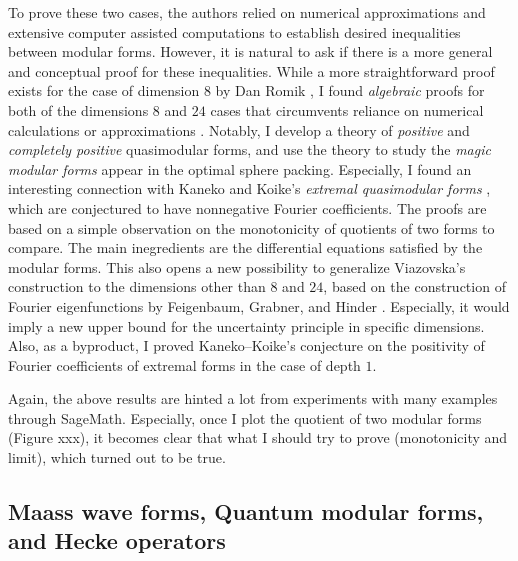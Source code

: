 \documentclass[12pt]{article}
\begin{document}
To prove these two cases, the authors \cite{viazovska2017sphere,cohn2017sphere} relied on numerical approximations and extensive computer assisted computations to establish desired inequalities between modular forms. However, it is natural to ask if there is a more general and conceptual proof for these inequalities.
While a more straightforward proof exists for the case of dimension $8$ by Dan Romik \cite{romik2023viazovska}, I found \emph{algebraic} proofs for both of the dimensions $8$ and $24$ cases that circumvents reliance on numerical calculations or approximations \cite{lee2024algebraic}.
Notably, I develop a theory of \emph{positive} and \emph{completely positive} quasimodular forms, and use the theory to study the \emph{magic modular forms} appear in the optimal sphere packing.
Especially, I found an interesting connection with Kaneko and Koike's \emph{extremal quasimodular forms} \cite{kaneko2006extremal}, which are conjectured to have nonnegative Fourier coefficients.
The proofs are based on a simple observation on the monotonicity of quotients of two forms to compare.
The main inegredients are the differential equations satisfied by the modular forms.
This also opens a new possibility to generalize Viazovska's construction to the dimensions other than $8$ and $24$, based on the construction of Fourier eigenfunctions by Feigenbaum, Grabner, and Hinder \cite{feigenbaum2021eigenfunctions}.
Especially, it would imply a new upper bound for the uncertainty principle \cite{bourgain2010principe} in specific dimensions.
Also, as a byproduct, I proved Kaneko--Koike's conjecture on the positivity of Fourier coefficients of extremal forms in the case of depth $1$.

Again, the above results are hinted a lot from experiments with many examples through SageMath.
Especially, once I plot the quotient of two modular forms (Figure xxx), it becomes clear that what I should try to prove (monotonicity and limit), which turned out to be true.
\subsection*{Maass wave forms, Quantum modular forms, and Hecke operators}
\end{document}
